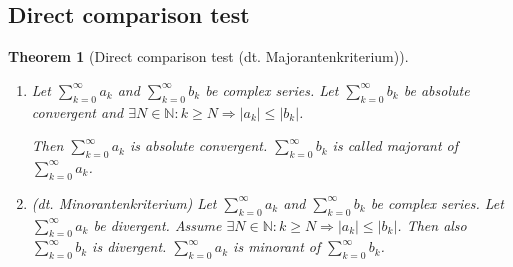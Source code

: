\documentclass[a4paper,landscape,twocolumn]{article}
\newtheorem{theorem}{Theorem}
\newcommand\abs[1]{\left|#1\right|}
\begin{document}
\subsection{Direct comparison test}
\begin{theorem}[Direct comparison test (dt. \foreignlanguage{ngerman}{Majorantenkriterium})]
  \hfill{} \\
  \begin{enumerate}
    \item
      Let $\sum_{k=0}^\infty a_k$ and $\sum_{k=0}^\infty b_k$ be complex series.
      Let $\sum_{k=0}^\infty b_k$ be absolute convergent and $\exists N \in \mathbb N: k \geq N
      \Rightarrow \abs{a_k} \leq \abs{b_k}$.

      Then $\sum_{k=0}^\infty a_k$ is absolute convergent.
      $\sum_{k=0}^\infty b_k$ is called \emph{majorant} of $\sum_{k=0}^\infty a_k$.

    \item (dt. \foreignlanguage{ngerman}{Minorantenkriterium})
      Let $\sum_{k=0}^\infty a_k$ and $\sum_{k=0}^\infty b_k$ be complex series.
      Let $\sum_{k=0}^\infty a_k$ be divergent.
      Assume $\exists N \in \mathbb N: k \geq N \Rightarrow \abs{a_k} \leq \abs{b_k}$.
      Then also $\sum_{k=0}^\infty b_k$ is divergent.
      $\sum_{k=0}^\infty a_k$ is \emph{minorant} of $\sum_{k=0}^\infty b_k$.
  \end{enumerate}
\end{theorem}
\end{document}
